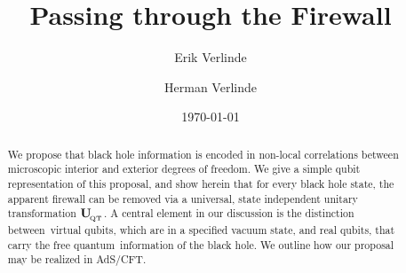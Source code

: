 \documentclass[aps,prd,twocolumn,nofootinbib,superscriptaddress,amssymb]{revtex4}
\def\be{\begin{equation}}
\def\ee{\end{equation}}
\begin{document}
\title{Passing through the Firewall}

\author{Erik Verlinde}


\def\spc{\hspace{.5pt}}


\author{Herman Verlinde}

\date{\today}

\begin{abstract}

We propose that black hole information is encoded in non-local correlations
between microscopic interior and exterior degrees of freedom. 
We give a simple qubit representation of this proposal, and show herein that for every black hole state, the apparent firewall can be removed 
via a universal, state independent unitary transformation ${\bf U}_{{\! }_{\rm QT}}$.  
A central element in our discussion is the distinction between~virtual qubits, which are in a specified vacuum state, and real qubits, that carry the free quantum~information of the black hole. We outline how our proposal may be realized in AdS/CFT.


\end{abstract}


\def\be{\begin{equation}}
\def\ee{\end{equation}}
\maketitle
\def\mathbi#1{\textbf{\em #1}} 
\def\la{\langle}
\def\bea{\begin{eqnarray}}
\def\eea{\end{eqnarray}}
\def\is{\! & \! = \! & \!}
\def\half{{\textstyle{\frac 12}}}

\def\ba{\begin{eqnarray}}
\def\ea{\end{eqnarray}}
\end{document}
